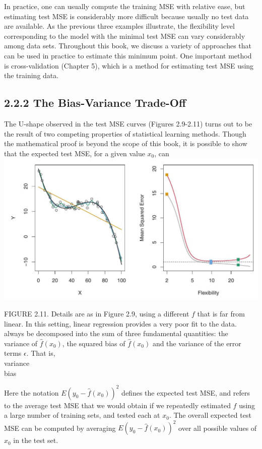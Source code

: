 \documentclass[10pt]{article}
\begin{document}
In practice, one can usually compute the training MSE with relative ease, but estimating test MSE is considerably more difficult because usually no test data are available. As the previous three examples illustrate, the flexibility level corresponding to the model with the minimal test MSE can vary considerably among data sets. Throughout this book, we discuss a variety of approaches that can be used in practice to estimate this minimum point. One important method is cross-validation (Chapter 5), which is a method for estimating test MSE using the training data.

\subsection*{2.2.2 The Bias-Variance Trade-Off}
The U-shape observed in the test MSE curves (Figures 2.9-2.11) turns out to be the result of two competing properties of statistical learning methods. Though the mathematical proof is beyond the scope of this book, it is possible to show that the expected test MSE, for a given value $x_{0}$, can\\
\includegraphics[max width=\textwidth, center]{2025_05_05_efe77898333945044de4g-049}

FIGURE 2.11. Details are as in Figure 2.9, using a different $f$ that is far from linear. In this setting, linear regression provides a very poor fit to the data.\\
always be decomposed into the sum of three fundamental quantities: the\\
variance of $\hat{f}\left(x_{0}\right)$, the squared bias of $\hat{f}\left(x_{0}\right)$ and the variance of the error terms $\epsilon$. That is,\\
variance\\
bias

Here the notation $E\left(y_{0}-\hat{f}\left(x_{0}\right)\right)^{2}$ defines the expected test MSE, and refers to the average test MSE that we would obtain if we repeatedly estimated $f$ using a large number of training sets, and tested each at $x_{0}$. The overall expected test MSE can be computed by averaging $E\left(y_{0}-\hat{f}\left(x_{0}\right)\right)^{2}$ over all possible values of $x_{0}$ in the test set.
\end{document}
